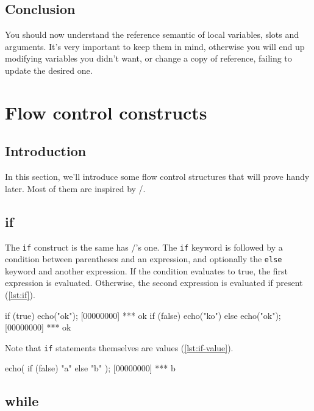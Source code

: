 \section{Conclusion}

You should now understand the reference semantic of local variables,
slots and arguments. It's very important to keep them in mind,
otherwise you will end up modifying variables you didn't want, or
change a copy of reference, failing to update the desired one.

\chapter{Flow control constructs}

\section{Introduction}

In this section, we'll introduce some flow control structures that
will prove handy later. Most of them are inspired by \C/\Cxx.

\section{if}

The \texttt{if} construct is the same has \C/\Cxx's one. The
\texttt{if} keyword is followed by a condition between parentheses and
an expression, and optionally the \texttt{else} keyword and another
expression. If the condition evaluates to true, the first expression
is evaluated. Otherwise, the second expression is evaluated if
present (\autoref{lst:if}).

\begin{urbiscript}[caption=The \texttt{if} construct, label=lst:if]
if (true)
  echo("ok");
[00000000] *** ok
if (false)
  echo("ko")
else
  echo("ok");
[00000000] *** ok
\end{urbiscript}

Note that \lstinline|if| statements themselves are values
(\autoref{lst:if-value}).

\begin{urbiscript}[caption=\texttt{if} are values, label=lst:if-value]
echo({ if (false) "a" else "b" });
[00000000] *** b
\end{urbiscript}

\section{while}


